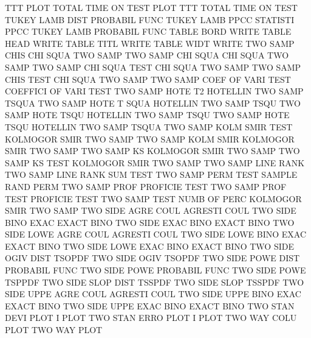 TTT      PLOT                           TOTAL    TIME ON   TEST PLOT
TTT                                     TOTAL    TIME ON   TEST
TUKEY    LAMB DIST                      PROBABIL FUNC
TUKEY    LAMB PPCC                      STATISTI PPCC
TUKEY    LAMB                           PROBABIL FUNC
TABLE    BORD                           WRITE
TABLE    HEAD                           WRITE
TABLE    TITL                           WRITE
TABLE    WIDT                           WRITE
TWO      SAMP CHIS                      CHI      SQUA TWO  SAMP
TWO      SAMP CHI  SQUA                 CHI      SQUA TWO  SAMP
TWO      SAMP CHI  SQUA TEST            CHI      SQUA TWO  SAMP
TWO      SAMP CHIS TEST                 CHI      SQUA TWO  SAMP
TWO      SAMP COEF OF   VARI TEST       COEFFICI OF   VARI TEST
TWO      SAMP HOTE T2                   HOTELLIN TWO  SAMP TSQUA
TWO      SAMP HOTE T    SQUA            HOTELLIN TWO  SAMP TSQU
TWO      SAMP HOTE TSQU                 HOTELLIN TWO  SAMP TSQU
TWO      SAMP HOTE TSQU                 HOTELLIN TWO  SAMP TSQUA
TWO      SAMP KOLM SMIR TEST            KOLMOGOR SMIR TWO  SAMP
TWO      SAMP KOLM SMIR                 KOLMOGOR SMIR TWO  SAMP
TWO      SAMP KS                        KOLMOGOR SMIR TWO  SAMP
TWO      SAMP KS   TEST                 KOLMOGOR SMIR TWO  SAMP
TWO      SAMP LINE RANK                 TWO      SAMP LINE RANK SUM TEST
TWO      SAMP PERM TEST                 SAMPLE   RAND PERM
TWO      SAMP PROF                      PROFICIE TEST
TWO      SAMP PROF TEST                 PROFICIE TEST
TWO      SAMP TEST NUMB OF   PERC       KOLMOGOR SMIR TWO  SAMP
TWO      SIDE AGRE COUL                 AGRESTI  COUL
TWO      SIDE BINO EXAC                 EXACT    BINO
TWO      SIDE EXAC BINO                 EXACT    BINO
TWO      SIDE LOWE AGRE COUL            AGRESTI  COUL
TWO      SIDE LOWE BINO EXAC            EXACT    BINO
TWO      SIDE LOWE EXAC BINO            EXACT    BINO
TWO      SIDE OGIV DIST                 TSOPDF
TWO      SIDE OGIV                      TSOPDF
TWO      SIDE POWE DIST                 PROBABIL FUNC
TWO      SIDE POWE                      PROBABIL FUNC
TWO      SIDE POWE                      TSPPDF
TWO      SIDE SLOP DIST                 TSSPDF
TWO      SIDE SLOP                      TSSPDF
TWO      SIDE UPPE AGRE COUL            AGRESTI  COUL
TWO      SIDE UPPE BINO EXAC            EXACT    BINO
TWO      SIDE UPPE EXAC BINO            EXACT    BINO
TWO      STAN DEVI PLOT                 I        PLOT
TWO      STAN ERRO PLOT                 I        PLOT
TWO      WAY  COLU PLOT                 TWO      WAY  PLOT
